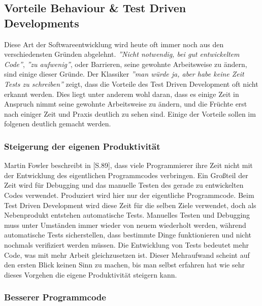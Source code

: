 \subsection{Vorteile Behaviour \& Test Driven Developments}

Diese Art der Softwareentwicklung wird heute oft immer noch aus den
verschiedensten Gründen abgelehnt. \textit{''Nicht notwendig, bei gut
  entwickeltem Code''}, \textit{''zu aufwenig''}, oder Barrieren,
seine gewohnte Arbeitsweise zu ändern, sind einige dieser Gründe. Der
Klassiker \textit{''man würde ja, aber habe keine Zeit Tests zu
  schreiben''} zeigt, dass die Vorteile des Test Driven Development
oft nicht erkannt werden. Dies liegt unter anderem wohl daran, dass es
einige Zeit in Anspruch nimmt seine gewohnte Arbeitsweise zu ändern,
und die Früchte erst nach einiger Zeit und Praxis deutlich zu sehen
sind. Einige der Vorteile sollen im folgenen deutlich gemacht werden.

\subsubsection{Steigerung der eigenen Produktivität}

Martin Fowler beschreibt in \cite{fowler99refactoring}[S.89], dass
viele Programmierer ihre Zeit nicht mit der Entwicklung des
eigentlichen Programmcodes verbringen. Ein Großteil der Zeit wird für
Debugging und das manuelle Testen des gerade zu entwickelten Codes
verwendet. Produziert wird hier nur der eigentliche Programmcode. Beim
Test Driven Development wird diese Zeit für die selben Ziele
verwendet, doch als Nebenprodukt entstehen automatische
Tests. Manuelles Testen und Debugging muss unter Umständen immer
wieder von neuem wiederholt werden, während automatische Tests
sicherstellen, dass bestimmte Dinge funktionieren und nicht nochmals
verifiziert werden müssen. Die Entwicklung von Tests bedeutet mehr
Code, was mit mehr Arbeit gleichzusetzen ist. Dieser Mehraufwand
scheint auf den ersten Blick keinen Sinn zu machen, bis man selbst
erfahren hat wie sehr dieses Vorgehen die eigene Produktivität
steigern kann.

\subsubsection{Besserer Programmcode}

